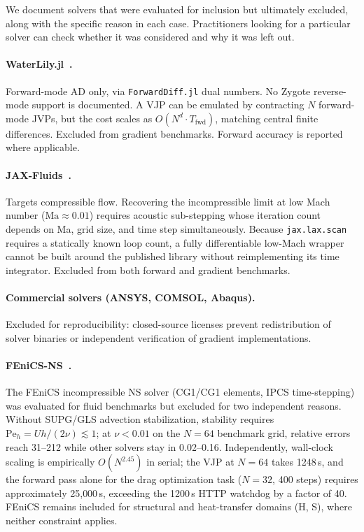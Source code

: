 \documentclass{article}
\begin{document}
We document solvers that were evaluated for inclusion but ultimately
excluded, along with the specific reason in each case. Practitioners
looking for a particular solver can check whether it was considered and
why it was left out.

\paragraph{WaterLily.jl~\cite{waterlily2024}.}
Forward-mode AD only, via \texttt{ForwardDiff.jl} dual numbers. No
Zygote reverse-mode support is documented. A VJP can be emulated by
contracting $N$ forward-mode JVPs, but the cost scales as
$O(N^d \cdot T_{\mathrm{fwd}})$, matching central finite differences.
Excluded from gradient benchmarks. Forward accuracy is reported where
applicable.

\paragraph{JAX-Fluids~\cite{jaxfluids2022}.}
Targets compressible flow. Recovering the incompressible limit at low Mach
number ($\mathrm{Ma} \approx 0.01$) requires acoustic sub-stepping whose
iteration count depends on Ma, grid size, and time step simultaneously.
Because \texttt{jax.lax.scan} requires a statically known loop count, a
fully differentiable low-Mach wrapper cannot be built around the published
library without reimplementing its time integrator. Excluded from both
forward and gradient benchmarks.

\paragraph{Commercial solvers (ANSYS, COMSOL, Abaqus).}
Excluded for reproducibility: closed-source licenses prevent redistribution
of solver binaries or independent verification of gradient implementations.

\paragraph{FEniCS-NS~\cite{farrell2013automated}.}
The FEniCS incompressible NS solver (CG1/CG1 elements, IPCS time-stepping)
was evaluated for fluid benchmarks but excluded for two independent reasons.
Without SUPG/GLS advection stabilization, stability requires
$\mathrm{Pe}_h = Uh/(2\nu) \lesssim 1$; at $\nu < 0.01$ on the $N=64$
benchmark grid, relative errors reach 31--212 while other solvers stay in
0.02--0.16.
Independently, wall-clock scaling is empirically $O(N^{2.45})$ in serial;
the VJP at $N=64$ takes 1248\,s, and the forward pass alone for the drag
optimization task ($N=32$, 400 steps) requires approximately 25{,}000\,s,
exceeding the 1200\,s HTTP watchdog by a factor of 40.
FEniCS remains included for structural and heat-transfer domains (H, S),
where neither constraint applies.
\end{document}
